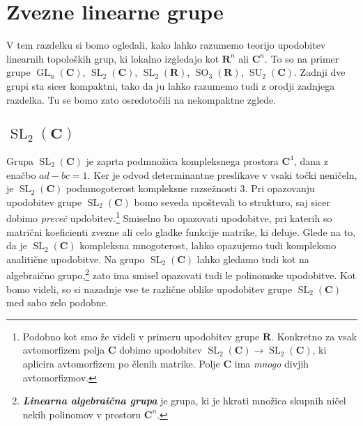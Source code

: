 \documentclass[11pt]{book}
\def\RR{\mathbf{R}}
\def\CC{\mathbf{C}}
\DeclareMathOperator\SU{SU}
\DeclareMathOperator\GL{GL}
\DeclareMathOperator\SL{SL}
\DeclareMathOperator\SO{SO}
\def\definicija{\color{rdeca}\bf\em}
\theoremstyle{definition}
\theoremstyle{zgled}
\theoremstyle{odprtproblem}
\theoremstyle{domacanaloga}
\theoremstyle{izrek}
\begin{document}

\section{Zvezne linearne grupe}

V tem razdelku si bomo ogledali, kako lahko razumemo teorijo upodobitev linearnih topoloških grup, ki lokalno izgledajo kot $\RR^n$ ali $\CC^n$. To so na primer grupe $\GL_n(\CC)$, $\SL_2(\CC)$, $\SL_2(\RR)$, $\SO_3(\RR)$, $\SU_2(\CC)$. Zadnji dve grupi sta sicer kompaktni, tako da ju lahko razumemo tudi z orodji zadnjega razdelka. Tu se bomo zato osredotočili na nekompaktne zglede.

\subsection{$\SL_2(\CC)$}

Grupa $\SL_2(\CC)$ je zaprta podmnožica kompleksnega prostora $\CC^4$, dana z enačbo $ad - bc = 1$. Ker je odvod determinantne preslikave v vsaki točki neničeln, je $\SL_2(\CC)$ podmnogoterost kompleksne razsežnosti $3$. Pri opazovanju upodobitev grupe $\SL_2(\CC)$ bomo seveda upoštevali to strukturo, saj sicer dobimo \emph{preveč} updobitev.\footnote{Podobno kot smo že videli v primeru upodobitev grupe $\RR$. Konkretno za vsak avtomorfizem polja $\CC$ dobimo upodobitev $\SL_2(\CC) \to \SL_2(\CC)$, ki aplicira avtomorfizem po členih matrike. Polje $\CC$ ima \emph{mnogo} divjih avtomorfizmov.} Smiselno bo opazovati upodobitve, pri katerih so matrični koeficienti zvezne ali celo gladke funkcije matrike, ki deluje. Glede na to, da je $\SL_2(\CC)$ kompleksna mnogoterost, lahko opazujemo tudi kompleksno analitične upodobitve. Na grupo $\SL_2(\CC)$ lahko gledamo tudi kot na algebraično grupo,\footnote{{\definicija Linearna algebraična grupa} je grupa, ki je hkrati množica skupnih ničel nekih polinomov v prostoru $\CC^n$.} zato ima smisel opazovati tudi le polinomske upodobitve. Kot bomo videli, so si nazadnje vse te različne oblike upodobitev grupe $\SL_2(\CC)$ med sabo zelo podobne.
\end{document}
